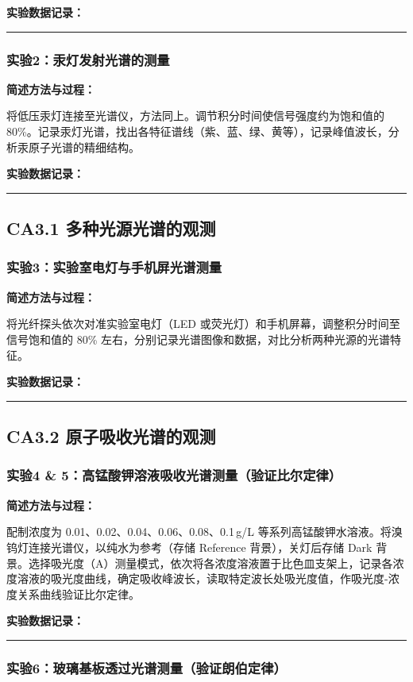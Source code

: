 \documentclass[dvipsnames, svgnames,a4paper,11pt]{article}
\newcommand{\recordblank}[1]{%
  \par\noindent\rule{0.95\linewidth}{0pt}\rule{0pt}{#1}\par}
\begin{document}
\textbf{实验数据记录：}
\recordblank{5.5cm}
\subsubsection{实验2：汞灯发射光谱的测量}

\textbf{简述方法与过程：}

将低压汞灯连接至光谱仪，方法同上。调节积分时间使信号强度约为饱和值的 80\%。记录汞灯光谱，找出各特征谱线（紫、蓝、绿、黄等），记录峰值波长，分析汞原子光谱的精细结构。

\textbf{实验数据记录：}
\recordblank{5.5cm}
\subsection{CA3.1 多种光源光谱的观测}

\subsubsection{实验3：实验室电灯与手机屏光谱测量}

\textbf{简述方法与过程：}

将光纤探头依次对准实验室电灯（LED 或荧光灯）和手机屏幕，调整积分时间至信号饱和值的 80\% 左右，分别记录光谱图像和数据，对比分析两种光源的光谱特征。

\textbf{实验数据记录：}
\recordblank{5.5cm}
\subsection{CA3.2 原子吸收光谱的观测}

\subsubsection{实验4 \& 5：高锰酸钾溶液吸收光谱测量（验证比尔定律）}

\textbf{简述方法与过程：}

配制浓度为 0.01、0.02、0.04、0.06、0.08、0.1\,g/L 等系列高锰酸钾水溶液。将溴钨灯连接光谱仪，以纯水为参考（存储 Reference 背景），关灯后存储 Dark 背景。选择吸光度（A）测量模式，依次将各浓度溶液置于比色皿支架上，记录各浓度溶液的吸光度曲线，确定吸收峰波长，读取特定波长处吸光度值，作吸光度-浓度关系曲线验证比尔定律。

\textbf{实验数据记录：}
\recordblank{5.5cm}
\subsubsection{实验6：玻璃基板透过光谱测量（验证朗伯定律）}
\end{document}
